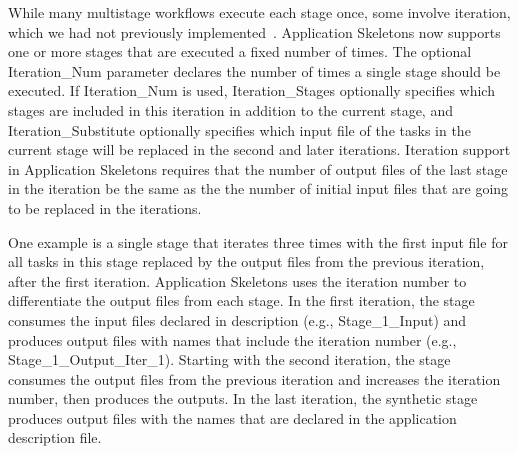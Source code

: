 \documentclass[preprint,12pt]{elsarticle}
\newcommand{\katznote}[1]{ {\textcolor{blue}    { ***Dan:   #1 }}}
\newcommand{\zhaonote}[1]{{\textcolor{darkgreen}{ ***Zhao:  #1 }}}
\newcommand{\katznote}[1]{}
\newcommand{\zhaonote}[1]{}
\begin{document}

While many multistage workflows execute 
each stage once, some involve iteration, which we had not previously implemented~\cite{Skeleton2013}. Application Skeletons now supports one or more stages that are executed a fixed number of times. 
The optional Iteration\_Num parameter declares the number of times a single stage should be executed.
If Iteration\_Num is used, Iteration\_Stages optionally specifies which stages are included in this iteration in addition to the current stage, and
Iteration\_Substitute optionally specifies which input file of the tasks in the current stage will be replaced in the second and later iterations.
%
Iteration support in Application Skeletons requires that the number of output files of the last
stage in the iteration be the same as the the number of initial input files that are going to be replaced in the iterations.

One example is a single stage that iterates three times with the 
first input file for all tasks in this stage replaced by the output files from the previous iteration, after the first iteration. Application Skeletons uses the iteration 
number to differentiate the output files from each stage. In the first iteration, the stage consumes the input files
declared in description (e.g., Stage\_1\_Input) and produces output files with names that include the iteration 
number (e.g., Stage\_1\_Output\_Iter\_1). Starting with the second iteration, the stage consumes the output files from the previous
iteration and increases the iteration number, then produces the outputs. In the last iteration,
the synthetic stage produces output files with the names that are declared in the application description file.
\end{document}
